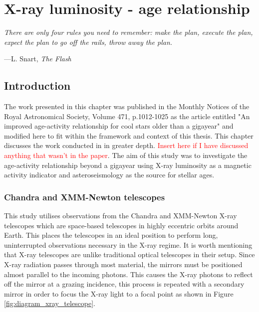 
\chapter{X-ray luminosity - age relationship} %

\label{Chapter3} %


\epigraph{\itshape There are only four rules you need to remember: make the plan, execute the plan, expect the plan to go off the rails, throw away the plan.}{---L. Snart, \itshape The Flash}

\section{Introduction}
The work presented in this chapter was published in the Monthly Notices of the Royal Astronomical Society, Volume 471, p.1012-1025 as the article entitled "An improved age-activity relationship for cool stars older than a gigayear" \citep{Booth_etal_2017} and modified here to fit within the framework and context of this thesis. This chapter discusses the work conducted in \citet{Booth_etal_2017} in greater depth. \textcolor{red}{Insert here if I have discussed anything that wasn't in the paper}. The aim of this study was to investigate the age-activity relationship beyond a gigayear using X-ray luminosity as a magnetic activity indicator and asteroseismology as the source for stellar ages.

\subsection{Chandra and XMM-Newton telescopes}
This study utilises observations from the Chandra and XMM-Newton X-ray telescopes which are space-based telescopes in highly eccentric orbits around Earth. This places the telescopes in an ideal position to perform long, uninterrupted observations necessary in the X-ray regime. It is worth mentioning that X-ray telescopes are unlike traditional optical telescopes in their setup. Since X-ray radiation passes through most material, the mirrors must be positioned almost parallel to the incoming photons. This causes the X-ray photons to reflect off the mirror at a grazing incidence, this process is repeated with a secondary mirror in order to focus the X-ray light to a focal point as shown in Figure \ref{fig:diagram_xray_telescope}.

